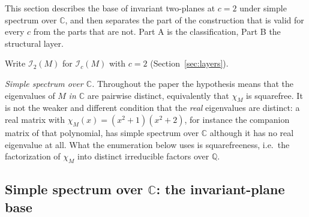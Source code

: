 \documentclass[journal]{IEEEtran}
\theoremstyle{plainn}
\theoremstyle{remark}
\begin{document}
This section describes the base of invariant two-planes at $c=2$ under simple spectrum over $\mathbb C$,
and then separates the part of the construction that is valid for every $c$ from the parts that are not.
Part A is the classification, Part B the structural layer.

Write $\mathcal I_2(M)$ for $\mathcal I_c(M)$ with $c=2$ (Section~\ref{sec:layers}).

\emph{Simple spectrum over $\mathbb C$.} Throughout the paper the hypothesis means that the eigenvalues
of $M$ \emph{in $\mathbb C$} are pairwise distinct, equivalently that $\chi_M$ is squarefree. It is not
the weaker and different condition that the \emph{real} eigenvalues are distinct: a real matrix with
$\chi_M(x)=(x^2+1)(x^2+2)$, for instance the companion matrix of that polynomial, has simple spectrum over
$\mathbb C$ although it has no real eigenvalue at all. What the enumeration below uses is squarefreeness,
i.e.\ the factorization of $\chi_M$ into distinct irreducible factors over $\mathbb Q$.

\subsection{Simple spectrum over \texorpdfstring{$\mathbb C$}{C}: the invariant-plane base}\label{sec:base:a}
\end{document}
